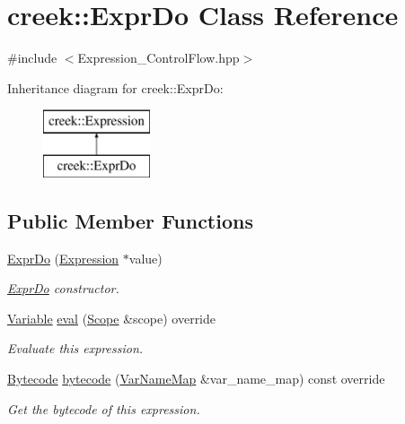 \hypertarget{classcreek_1_1_expr_do}{}\section{creek\+:\+:Expr\+Do Class Reference}
\label{classcreek_1_1_expr_do}


{\ttfamily \#include $<$Expression\+\_\+\+Control\+Flow.\+hpp$>$}

Inheritance diagram for creek\+:\+:Expr\+Do\+:\begin{figure}[H]
\begin{center}
\leavevmode
\includegraphics[height=2.000000cm]{classcreek_1_1_expr_do}
\end{center}
\end{figure}
\subsection*{Public Member Functions}
\begin{DoxyCompactItemize}
\item 
\hyperlink{classcreek_1_1_expr_do_abed09c24141488cf367b35ebcc864b27}{Expr\+Do} (\hyperlink{classcreek_1_1_expression}{Expression} $\ast$value)
\begin{DoxyCompactList}\small\item\em {\ttfamily \hyperlink{classcreek_1_1_expr_do}{Expr\+Do}} constructor. \end{DoxyCompactList}\item 
\hyperlink{classcreek_1_1_variable}{Variable} \hyperlink{classcreek_1_1_expr_do_aebcd267e0a9ad22fcd9cef61901b12cb}{eval} (\hyperlink{classcreek_1_1_scope}{Scope} \&scope) override
\begin{DoxyCompactList}\small\item\em Evaluate this expression. \end{DoxyCompactList}\item 
\hyperlink{classcreek_1_1_bytecode}{Bytecode} \hyperlink{classcreek_1_1_expr_do_a06c819664705889da06c201b7e83f1c1}{bytecode} (\hyperlink{classcreek_1_1_var_name_map}{Var\+Name\+Map} \&var\+\_\+name\+\_\+map) const  override\hypertarget{classcreek_1_1_expr_do_a06c819664705889da06c201b7e83f1c1}{}\label{classcreek_1_1_expr_do_a06c819664705889da06c201b7e83f1c1}

\begin{DoxyCompactList}\small\item\em Get the bytecode of this expression. \end{DoxyCompactList}\end{DoxyCompactItemize}


